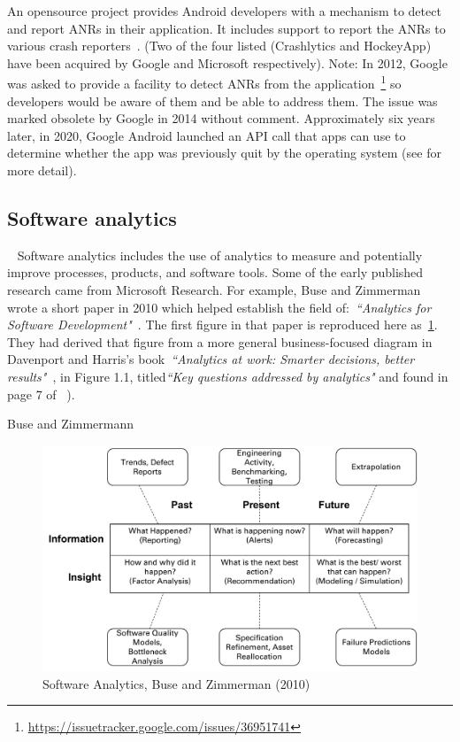 An opensource project provides Android developers with a mechanism to detect and report ANRs in their application. It includes support to report the ANRs to various crash reporters~\cite{salomonbrys_github_anr_watchdog}. (Two of the four listed (Crashlytics and HockeyApp) have been acquired by Google and Microsoft respectively). Note: In 2012, Google was asked to provide a facility to detect ANRs from the application~\footnote{\url{https://issuetracker.google.com/issues/36951741}} so developers would be aware of them and be able to address them. The issue was marked obsolete by Google in 2014 without comment. Approximately six years later, in 2020, Google Android launched an API call that apps can use to determine whether the app was previously quit by the operating system (see  for more detail). 

\subsection{Software analytics}~\label{rw-software-analytics-topic}
Software analytics includes the use of analytics to measure and potentially improve processes, products, and software tools. Some of the early published research came from Microsoft Research. For example, Buse and Zimmerman wrote a short paper in 2010 which helped establish the field of:~\emph{``Analytics for Software Development"}~. The first figure in that paper is reproduced here as~\ref{fig:software_analytics_buse_and_zimmerman_2010}. They had derived that figure from a more general business-focused diagram in Davenport and Harris's book~\emph{``Analytics at work: Smarter decisions, better results"}~\cite{davenport2010analytics_at_work},  in Figure 1.1, titled\emph{``Key questions addressed by analytics"} and found in page 7 of ~). 

Buse and Zimmermann
\begin{figure}
    \centering
    \includegraphics[width=\linewidth]{images/related-work/buse_and_zimmermann_2010_figure_a.pdf}
    \caption{Software Analytics, Buse and Zimmerman (2010)}
    \label{fig:software_analytics_buse_and_zimmerman_2010}
\end{figure}


